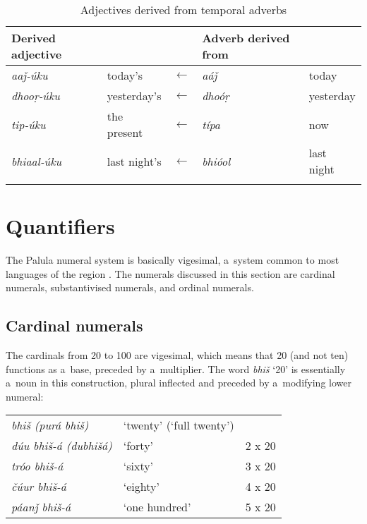 {\begin{table}[ht]
\caption{Adjectives derived from temporal adverbs}

\begin{tabularx}{\textwidth}{ Q l l Q l }
\lsptoprule
Derived adjective &
&
&
Adverb derived from &
\\\hline
\textit{aaǰ-úku} &
today's &
$\leftarrow$ &
\textit{aáǰ} &
today\\
\textit{dhooṛ-úku} &
yesterday's &
$\leftarrow$ &
\textit{dhoóṛ} &
yesterday\\
\textit{tip-úku} &
the present &
$\leftarrow$ &
\textit{típa} &
now\\
\textit{bhiaal-úku} &
last night's &
$\leftarrow$ &
\textit{bhióol} &
last night\\\lspbottomrule
\end{tabularx}
\label{tab:6-6}
\end{table}


\section{Quantifiers}
\label{sec:6-4}

The Palula numeral system is basically vigesimal, a~system common to most languages of the region \citep[823]{bashir2003}. The numerals discussed in this section are cardinal numerals, substantivised numerals, and ordinal numerals.


\subsection{Cardinal numerals}
\label{subsec:6-4-1}

The cardinals from 20 to 100 are vigesimal, which means that 20 (and not ten) functions as a~base, preceded by a~multiplier. The word \textit{bhiš} `20' is essentially a~noun in this construction, plural inflected and preceded by a~modifying lower numeral: 



\begin{table}[H]
\begin{tabularx}{\textwidth}{ Q Q l@{\hspace{50pt}} }

\textit{bhiš (purá bhiš)} &
`twenty' (`full twenty') &
\\
\textit{dúu bhiš-á (dubhišá)} &
`forty' &
2 x 20\\
\textit{tróo bhiš-á} &
`sixty' &
3 x 20\\
\textit{čúur bhiš-á} &
`eighty' &
4 x 20\\
\textit{páanǰ bhiš-á} &
`one hundred' &
5 x 20\\
\end{tabularx}
\end{table}


}
